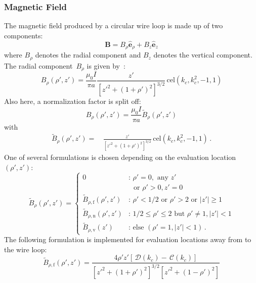 \subsubsection{Magnetic Field}
The magnetic field produced by a circular wire loop is made up of two components:
\begin{equation}
  \mathbf{B} = B_\rho \hat{\mathbf{e}}_\rho + B_z \hat{\mathbf{e}}_z
\end{equation}
where $B_\rho$ denotes the radial component and $B_z$ denotes the vertical component.
The radial component~$B_\rho$ is given by~\cite{teal}:
\begin{equation}
  B_\rho(\rho', z')
  = \frac{\mu_0 I}{\pi a} \frac{z'}{\left[ z'^2 + (1 + \rho')^2 \right]^{3/2}} \,\mathrm{cel}(k_c, k_c^2, -1, 1)
\end{equation}
Also here, a normalization factor is split off:
\begin{equation}
  B_\rho(\rho', z') = \frac{\mu_0 I}{\pi a} \tilde{B}_\rho(\rho', z')
\end{equation}
with
\begin{align}
  \tilde{B}_\rho(\rho', z')
  =&\, \frac{z'}{\left[ z'^2 + (1 + \rho')^2 \right]^{3/2}} \,\mathrm{cel}(k_c, k_c^2, -1, 1) \, .
\end{align}
One of several formulations is chosen depending on the evaluation location~$(\rho', z')$:
\begin{equation}
  \tilde{B}_\rho(\rho', z')
  = \begin{cases}
      0                                 &:\, \rho' = 0, \textrm{ any } z' \\
                    ~                   &\, ~\textrm{ or } \rho' > 0, z' = 0 \\
      \tilde{B}_{\rho,\mathrm{f}} (\rho', z') &:\, \rho' < 1/2 \textrm{ or } \rho' > 2 \textrm{ or } |z'| \geq 1 \\
      \tilde{B}_{\rho,\mathrm{n}} (\rho', z') &:\, 1/2 \leq \rho' \leq 2 \textrm{ but } \rho' \neq 1, |z'| < 1 \\
      \tilde{B}_{\rho,\mathrm{v}} (z')        &:\, \textrm{else } (\rho' = 1, |z'| < 1) \, .
    \end{cases} \label{eqn:cwl_B_rho_switchover}
\end{equation}
The following formulation is implemented for evaluation locations away from to the wire loop:
\begin{equation}
  \tilde{B}_{\rho,\mathrm{f}} (\rho', z')
  = \frac{4 \rho' z' \left[ \,\mathcal{D}(k_c) - \,\mathcal{C}(k_c) \right]}
         {\left[{z'}^2 + (1 + \rho')^2 \right]^{3/2} \left[{z'}^2 + (1 - \rho')^2 \right] } \label{eqn:cwl_B_rho_f}
\end{equation}
